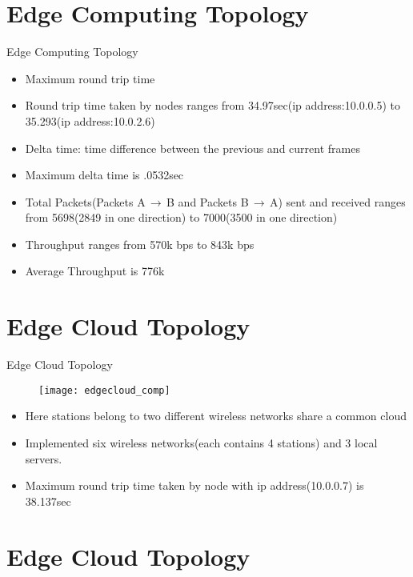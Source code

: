 \documentclass{beamer}
\begin{document}
\section{Edge Computing Topology}

\begin{frame}{Edge Computing Topology}
\begin{itemize}
	\item Maximum round trip time
	\item Round trip time taken by nodes ranges from 34.97sec(ip address:10.0.0.5) to 35.293(ip address:10.0.2.6)
	\item Delta time: time difference between the previous and current frames
	\item Maximum delta time is .0532sec
	\item Total Packets(Packets A$\,\to\,$B and Packets B$\,\to\,$A) sent and received ranges from 5698(2849 in one direction) to 7000(3500 in one direction)
	\item Throughput ranges from 570k bps to 843k bps
	\item Average Throughput is 776k 
	

\end{itemize}
\end{frame}

\section{Edge Cloud Topology}

\begin{frame}{Edge Cloud Topology}
\begin{figure}
\texttt{[image: edgecloud\_comp]}
\centering
\end{figure}

\begin{itemize}
	\item Here stations belong to two different wireless networks share a common cloud
	\item Implemented six wireless networks(each contains 4 stations) and 3 local servers.
	\item Maximum round trip time taken by node with ip address(10.0.0.7) is 38.137sec

\end{itemize}

\end{frame}
\section{Edge Cloud Topology}
\end{document}
